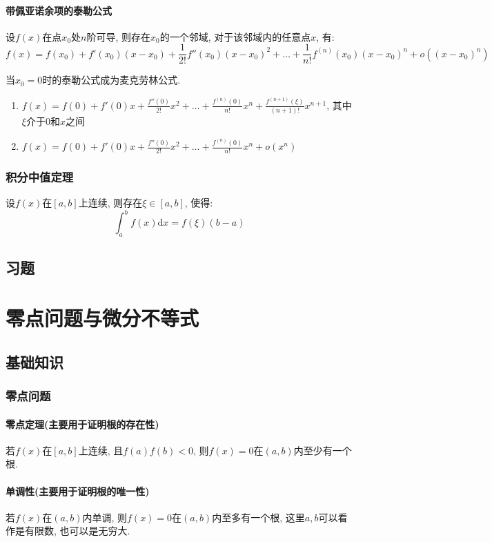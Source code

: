 \subsubsection{带佩亚诺余项的泰勒公式}
设$ f(x) $在点$ x_{0} $处$ n $阶可导, 则存在$ x_{0} $的一个邻域, 对于该邻域内的任意点$ x $, 有:
\begin{equation*}
    f(x)=f(x_{0})+f'(x_{0})(x-x_{0})+\frac{1}{2!}f''(x_{0})(x-x_{0})^{2}+\dots+\frac{1}{n!}f^{(n)}(x_{0})(x-x_{0})^{n}+o((x-x_{0})^{n})
\end{equation*}
\begin{tcolorbox}
    当$ x_{0}=0 $时的泰勒公式成为麦克劳林公式.
    \begin{enumerate}
        \item $ f(x)=f(0)+f'(0)x+\frac{f''(0)}{2!}x^{2}+\dots+\frac{f^{(n)}(0)}{n!}x^{n}+\frac{f^{(n+1)}(\xi)}{(n+1)!}x^{n+1} $, 其中$ \xi $介于$ 0 $和$ x $之间
        \item $ f(x)=f(0)+f'(0)x+\frac{f''(0)}{2!}x^{2}+\dots+\frac{f^{(n)}(0)}{n!}x^{n}+o(x^{n}) $
    \end{enumerate}
\end{tcolorbox}
\subsection{积分中值定理}
设$ f(x) $在$ [a,b] $上连续, 则存在$ \xi\in[a,b] $, 使得:
\begin{equation*}
    \int_{a}^{b}f(x)\mathrm{d}x=f(\xi)(b-a)
\end{equation*}
\section{习题}
\chapter{零点问题与微分不等式}
\section{基础知识}
\subsection{零点问题}
\subsubsection{零点定理(主要用于证明根的存在性)}
若$ f(x) $在$ [a,b] $上连续, 且$ f(a)f(b)<0 $, 则$ f(x)=0 $在$ (a,b) $内至少有一个根.
\subsubsection{单调性(主要用于证明根的唯一性)}
若$ f(x) $在$ (a,b) $内单调, 则$ f(x)=0 $在$ (a,b) $内至多有一个根, 这里$ a,b $可以看作是有限数, 也可以是无穷大.
